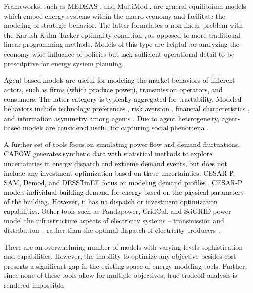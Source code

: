 Frameworks, such as MEDEAS \cite{capellan-perez_medeas_2020}, and MultiMod
\cite{huppmann_market_2014}, are general equilibrium models which embed energy
systems within the macro-economy and facilitate the modeling of strategic
behavior. The latter formulates a non-linear problem with the Karush-Kuhn-Tucker
optimality condition \cite{huppmann_market_2014}, as opposed to more traditional
linear programming methods. Models of this type are helpful for analyzing the
economy-wide influence of policies but lack sufficient operational detail to be
prescriptive for energy system planning.

\textcolor{black}{Agent-based models are useful for modeling the market
behaviors of different actors, such as firms (which produce power), transmission
operators, and consumers. The latter category is typically aggregated for
tractability. Modeled behaviors include technology preferences
\cite{anwar_modeling_2022, zade_quantifying_2020}, risk aversion
\cite{anwar_modeling_2022}, financial characteristics \cite{anwar_modeling_2022,
nitsch_economic_2021}, and information asymmetry among agents
\cite{anwar_modeling_2022, nitsch_economic_2021}. Due to agent heterogeneity,
agent-based models are considered useful for capturing social phenomena
\cite{yue_review_2018,fattahi_systemic_2020}.}

A further set of tools focus on simulating power flow and demand fluctuations.
\textcolor{black}{CAPOW \cite{su_open_2020} generates synthetic data with
statistical methods to explore uncertainties in energy dispatch and extreme
demand events, but does not include any investment optimization based on these
uncertainties.} \textcolor{black}{CESAR-P, SAM, Demod, and DESSTinEE focus on
modeling demand profiles
\cite{leoniefierz_hues-platformcesar-p-core_2021,bosmann_shape_2015,barsanti_socio-technical_2021}.
CESAR-P models individual building demand for energy based on the physical
parameters of the building. However, it has no dispatch or investment
optimization capabilities.} Other tools such as Pandapower, GridCal, and SciGRID
power model the infrastructure aspects of electricity systems -- transmission
and distribution -- rather than the optimal dispatch of electricity producers
\cite{thurner_pandapower_2018, vera_gridcal_2022, matke_structure_2017}.

There are an overwhelming number of models with varying levels sophistication and
capabilities. However, the inability to optimize any objective besides cost
presents a significant gap in the existing space of energy modeling tools.
Further, since none of these tools allow for multiple objectives, true tradeoff
analysis is rendered impossible.



